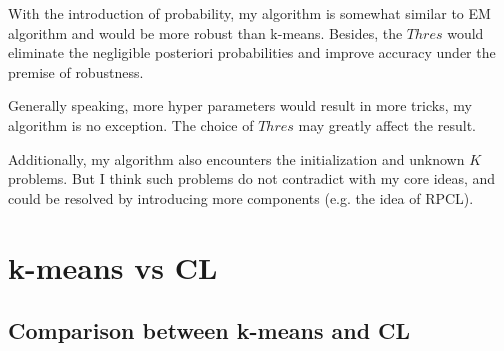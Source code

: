 \documentclass[12pt,a4paper]{article}
\theoremstyle{definition}
\begin{document}
With the introduction of probability, my algorithm is somewhat similar to EM algorithm and would be more robust than k-means. Besides, the $Thres$ would eliminate the negligible posteriori probabilities and improve accuracy under the premise of robustness.

Generally speaking, more hyper parameters would result in more tricks, my algorithm is no exception. The choice of $Thres$ may greatly affect the result.

Additionally, my algorithm also encounters the initialization and unknown $K$ problems. But I think such problems do not contradict with my core ideas, and could be resolved by introducing more components (e.g. the idea of RPCL).

\vspace{-1\baselineskip}
\section{k-means vs CL}

\subsection{Comparison between k-means and CL}
\end{document}
